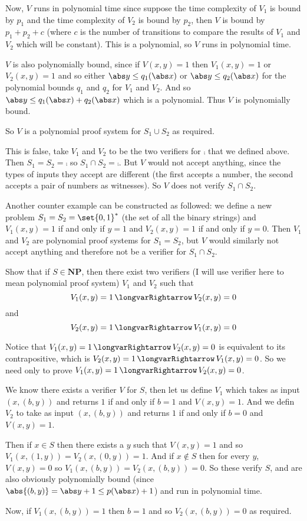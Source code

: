 \documentclass[10pt]{article}
\def\implies{\,\longvarRightarrow\,}
\def\NP{\mathbf{NP}}
\begin{document}
    Now, $V$ runs in polynomial time since suppose the time complexity of $V_1$ is bound by $p_1$ and the time complexity of $V_2$ is bound by $p_2$, then $V$ is bound by $p_1+p_2+c$ (where $c$ is the number
    of transitions to compare the results of $V_1$ and $V_2$ which will be constant).
    This is a polynomial, so $V$ runs in polynomial time.

    $V$ is also polynomially bound, since if $V(x,y)=1$ then $V_1(x,y)=1$ or $V_2(x,y)=1$ and so either $\abs y\leq q_1(\abs x)$ or $\abs y\leq q_2(\abs x)$ for the polynomial bounds $q_1$ and $q_2$ for
    $V_1$ and $V_2$.
    And so $\abs y\leq q_1(\abs x)+q_2(\abs x)$ which is a polynomial.
    Thus $V$ is polynomially bound.

    So $V$ is a polynomial proof system for $S_1\cup S_2$ as required.

    \item This is false, take $V_1$ and $V_2$ to be the two verifiers for $\comp$ that we defined above.
    Then $S_1=S_2=\comp$ so $S_1\cap S_2=\comp$.
    But $V$ would not accept anything, since the types of inputs they accept are different (the first accepts a number, the second accepts a pair of numbers as witnesses).
    So $V$ does not verify $S_1\cap S_2$.

    Another counter example can be constructed as followed: we define a new problem $S_1=S_2=\set{0,1}^*$ (the set of all the binary strings) and $V_1(x,y)=1$ if and only if $y=1$ and $V_2(x,y)=1$ if and
    only if $y=0$.
    Then $V_1$ and $V_2$ are polynomial proof systems for $S_1=S_2$, but $V$ would similarly not accept anything and therefore not be a verifier for $S_1\cap S_2$.
\eenum

\begin{exercise*}

    Show that if $S\in\NP$, then there exist two verifiers (I will use verifier here to mean polynomial proof system) $V_1$ and $V_2$ such that
    \[ V_1(x,y) = 1 \implies V_2(x,y) = 0 \]
    and
    \[ V_2(x,y) = 1 \implies V_1(x,y) = 0 \]

\end{exercise*}

Notice that $V_1(x,y)=1\implies V_2(x,y)=0$ is equivalent to its contrapositive, which is $V_2(x,y)=1\implies V_1(x,y)=0$.
So we need only to prove $V_1(x,y)=1\implies V_2(x,y)=0$.

We know there exists a verifier $V$ for $S$, then let us define $V_1$ which takes as input $(x,(b,y))$ and returns $1$ if and only if $b=1$ and $V(x,y)=1$.
And we defin $V_2$ to take as input $(x,(b,y))$ and returns $1$ if and only if $b=0$ and $V(x,y)=1$.

Then if $x\in S$ then there exists a $y$ such that $V(x,y)=1$ and so $V_1(x,(1,y))=V_2(x,(0,y))=1$.
And if $x\notin S$ then for every $y$, $V(x,y)=0$ so $V_1(x,(b,y))=V_2(x,(b,y))=0$.
So these verify $S$, and are also obviously polynomially bound (since $\abs{(b,y)}=\abs y+1\leq p(\abs x)+1$) and run in polynomial time.

Now, if $V_1(x,(b,y))=1$ then $b=1$ and so $V_2(x,(b,y))=0$ as required.
\end{document}
